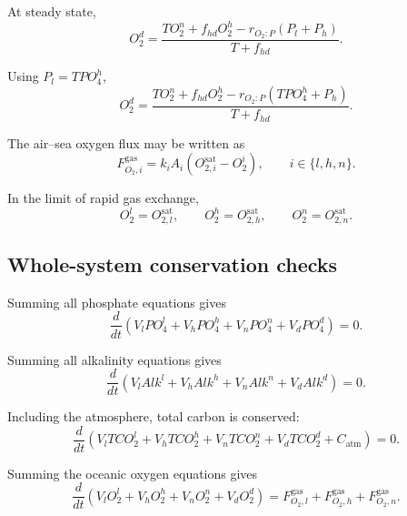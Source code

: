 \documentclass[11pt]{article}
\begin{document}
At steady state,
\begin{equation}
O_2^d
=
\frac{
T O_2^n
+
f_{hd}O_2^h
-
r_{O_2:P}\left(P_l+P_h\right)
}{
T+f_{hd}
}.
\label{eq:four_o2_d_steady}
\end{equation}

Using \(P_l=TPO_4^h\),
\begin{equation}
O_2^d
=
\frac{
T O_2^n
+
f_{hd}O_2^h
-
r_{O_2:P}\left(TPO_4^h+P_h\right)
}{
T+f_{hd}
}.
\label{eq:four_o2_d_steady_sub}
\end{equation}

The air--sea oxygen flux may be written as
\begin{equation}
F^{\mathrm{gas}}_{O_2,i}
=
k_iA_i
\left(
O_{2,i}^{\mathrm{sat}}-O_2^i
\right),
\qquad
i\in\{l,h,n\}.
\label{eq:four_o2_gas_flux}
\end{equation}

In the limit of rapid gas exchange,
\begin{equation}
O_2^l=O_{2,l}^{\mathrm{sat}},
\qquad
O_2^h=O_{2,h}^{\mathrm{sat}},
\qquad
O_2^n=O_{2,n}^{\mathrm{sat}}.
\label{eq:four_o2_saturation}
\end{equation}

\subsection{Whole-system conservation checks}

Summing all phosphate equations gives
\begin{equation}
\frac{d}{dt}
\left(
V_lPO_4^l
+
V_hPO_4^h
+
V_nPO_4^n
+
V_dPO_4^d
\right)
=
0.
\label{eq:four_total_po4}
\end{equation}

Summing all alkalinity equations gives
\begin{equation}
\frac{d}{dt}
\left(
V_lAlk^l
+
V_hAlk^h
+
V_nAlk^n
+
V_dAlk^d
\right)
=
0.
\label{eq:four_total_alk}
\end{equation}

Including the atmosphere, total carbon is conserved:
\begin{equation}
\frac{d}{dt}
\left(
V_lTCO_2^l
+
V_hTCO_2^h
+
V_nTCO_2^n
+
V_dTCO_2^d
+
C_{\mathrm{atm}}
\right)
=
0.
\label{eq:four_total_carbon}
\end{equation}

Summing the oceanic oxygen equations gives
\begin{equation}
\frac{d}{dt}
\left(
V_lO_2^l
+
V_hO_2^h
+
V_nO_2^n
+
V_dO_2^d
\right)
=
F^{\mathrm{gas}}_{O_2,l}
+
F^{\mathrm{gas}}_{O_2,h}
+
F^{\mathrm{gas}}_{O_2,n}.
\label{eq:four_total_o2}
\end{equation}
\end{document}
